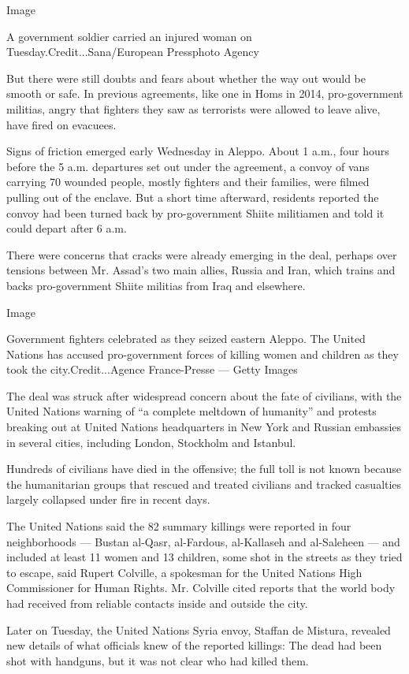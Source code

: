 Image

A government soldier carried an injured woman on
Tuesday.Credit...Sana/European Pressphoto Agency

But there were still doubts and fears about whether the way out would be
smooth or safe. In previous agreements, like one in Homs in 2014,
pro-government militias, angry that fighters they saw as terrorists were
allowed to leave alive, have fired on evacuees.

Signs of friction emerged early Wednesday in Aleppo. About 1 a.m., four
hours before the 5 a.m. departures set out under the agreement, a convoy
of vans carrying 70 wounded people, mostly fighters and their families,
were filmed pulling out of the enclave. But a short time afterward,
residents reported the convoy had been turned back by pro-government
Shiite militiamen and told it could depart after 6 a.m.

There were concerns that cracks were already emerging in the deal,
perhaps over tensions between Mr. Assad's two main allies, Russia and
Iran, which trains and backs pro-government Shiite militias from Iraq
and elsewhere.

Image

Government fighters celebrated as they seized eastern Aleppo. The United
Nations has accused pro-government forces of killing women and children
as they took the city.Credit...Agence France-Presse --- Getty Images

The deal was struck after widespread concern about the fate of
civilians, with the United Nations warning of ``a complete meltdown of
humanity'' and protests breaking out at United Nations headquarters in
New York and Russian embassies in several cities, including London,
Stockholm and Istanbul.

Hundreds of civilians have died in the offensive; the full toll is not
known because the humanitarian groups that rescued and treated civilians
and tracked casualties largely collapsed under fire in recent days.

The United Nations said the 82 summary killings were reported in four
neighborhoods --- Bustan al-Qasr, al-Fardous, al-Kallaseh and
al-Saleheen --- and included at least 11 women and 13 children, some
shot in the streets as they tried to escape, said Rupert Colville, a
spokesman for the United Nations High Commissioner for Human Rights. Mr.
Colville cited reports that the world body had received from reliable
contacts inside and outside the city.

Later on Tuesday, the United Nations Syria envoy, Staffan de Mistura,
revealed new details of what officials knew of the reported killings:
The dead had been shot with handguns, but it was not clear who had
killed them.


